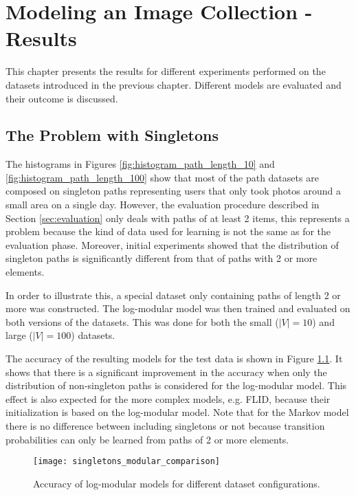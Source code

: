 \chapter{Modeling an Image Collection - Results}
\label{sec:results}

This chapter presents the results for different experiments performed on the datasets introduced in the previous chapter. Different models are evaluated and their outcome is discussed.

\section{The Problem with Singletons}

The histograms in Figures \ref{fig:histogram_path_length_10} and \ref{fig:histogram_path_length_100} show that most of the path datasets are composed on singleton paths representing users that only took photos around a small area on a single day. However, the evaluation procedure described in Section \ref{sec:evaluation} only deals with paths of at least 2 items, this represents a problem because the kind of data used for learning is not the same as for the evaluation phase. Moreover, initial experiments showed that the distribution of singleton paths is significantly different from that of paths with 2 or more elements.

In order to illustrate this, a special dataset only containing paths of length 2 or more was constructed. The log-modular model was then trained and evaluated on both versions of the datasets. This was done for both the small ($|V|=10$) and large ($|V|=100$) datasets.

The accuracy of the resulting models for the test data is shown in Figure \ref{fig:comparison_singletons_modular}. It shows that there is a significant improvement in the accuracy when only the distribution of non-singleton paths is considered for the log-modular model. This effect is also expected for the more complex models, e.g. FLID, because their initialization is based on the log-modular model. Note that for the Markov model there is no difference between including singletons or not because transition probabilities can only be learned from paths of 2 or more elements.

\begin{figure}
  \centering
  \texttt{[image: singletons\_modular\_comparison]}
  \caption{Accuracy of log-modular models for different dataset configurations.}
  \label{fig:comparison_singletons_modular}
\end{figure}


